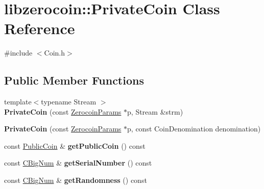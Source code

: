 \hypertarget{classlibzerocoin_1_1_private_coin}{}\section{libzerocoin\+:\+:Private\+Coin Class Reference}
\label{classlibzerocoin_1_1_private_coin}


{\ttfamily \#include $<$Coin.\+h$>$}

\subsection*{Public Member Functions}
\begin{DoxyCompactItemize}
\item 
\mbox{\label{classlibzerocoin_1_1_private_coin_af402bbd2d4e91d4b1c576c18cf769d5b}} 
{\footnotesize template$<$typename Stream $>$ }\\{\bfseries Private\+Coin} (const \mbox{\hyperlink{classlibzerocoin_1_1_zerocoin_params}{Zerocoin\+Params}} $\ast$p, Stream \&strm)
\item 
\mbox{\label{classlibzerocoin_1_1_private_coin_a62fe12639a5a9e520f7bcc15722a1520}} 
{\bfseries Private\+Coin} (const \mbox{\hyperlink{classlibzerocoin_1_1_zerocoin_params}{Zerocoin\+Params}} $\ast$p, const Coin\+Denomination denomination)
\item 
\mbox{\label{classlibzerocoin_1_1_private_coin_ae548bbe6dffd09cdc58860c0f1bfd833}} 
const \mbox{\hyperlink{classlibzerocoin_1_1_public_coin}{Public\+Coin}} \& {\bfseries get\+Public\+Coin} () const
\item 
\mbox{\label{classlibzerocoin_1_1_private_coin_aa0adb0b69df57a41aabec28e91ede86b}} 
const \mbox{\hyperlink{class_c_big_num}{C\+Big\+Num}} \& {\bfseries get\+Serial\+Number} () const
\item 
\mbox{\label{classlibzerocoin_1_1_private_coin_a48bb6b7a80d58e357348c294e9a34b71}} 
const \mbox{\hyperlink{class_c_big_num}{C\+Big\+Num}} \& {\bfseries get\+Randomness} () const
\item 
\mbox{\label{classlibzerocoin_1_1_private_coin_a997f62dcae761e174c2f8b15a3947425}} 

\end{DoxyCompactItemize}
